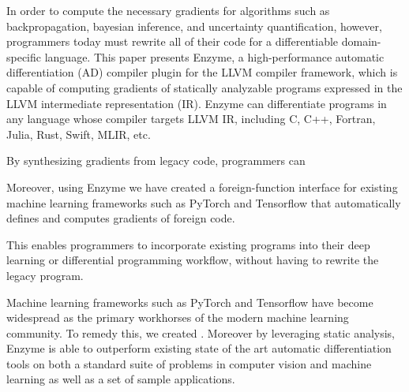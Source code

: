 




In order to compute the necessary gradients for algorithms such as backpropagation, bayesian inference, and uncertainty quantification, however, programmers today must rewrite all of their code for a differentiable domain-specific language.  This paper presents Enzyme, a high-performance automatic differentiation (AD) compiler plugin for the LLVM compiler framework, which is capable of computing gradients of statically analyzable programs expressed in the LLVM intermediate representation (IR).
Enzyme can differentiate programs in any language whose compiler targets LLVM IR, including C, C++, Fortran, Julia, Rust, Swift, MLIR, etc.  

By synthesizing gradients from legacy code, programmers can 

Moreover, using Enzyme we have created a foreign-function interface for existing machine learning frameworks such as PyTorch and Tensorflow that automatically defines and computes gradients of foreign code.






This enables programmers to incorporate existing programs into their deep learning or differential programming workflow, without having to rewrite the legacy program.

Machine learning frameworks such as PyTorch and Tensorflow have become widespread as the primary workhorses of the modern machine learning community. %
  To remedy this, we created .  Moreover by leveraging static analysis, Enzyme is able to outperform existing state of the art automatic differentiation tools on both a standard suite of problems in computer vision and machine learning as well as a set of sample applications.